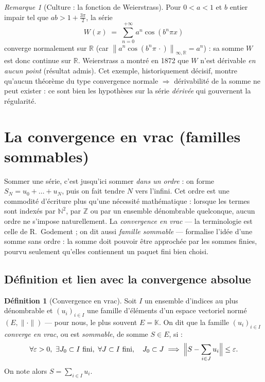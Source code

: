 \documentclass[11pt,a4paper]{article}
\theoremstyle{plain}
\theoremstyle{definition}
\newtheorem{definition}[theoreme]{Définition}
\theoremstyle{remark}
\newtheorem{remarque}[theoreme]{Remarque}
\newcommand{\R}{\mathbb{R}}
\newcommand{\N}{\mathbb{N}}
\newcommand{\K}{\mathbb{K}}
\newcommand{\eps}{\varepsilon}
\newcommand{\Ninf}[2]{\left\lVert #1 \right\rVert_{\infty,#2}}
\numberwithin{equation}{section}
\begin{document}
\begin{remarque}[Culture : la fonction de Weierstrass]
Pour $0<a<1$ et $b$ entier impair tel que $ab>1+\frac{3\pi}{2}$, la série
\[
    W(x) \;=\; \sum_{n=0}^{+\infty} a^n\cos\!\left(b^n\pi x\right)
\]
converge normalement sur $\R$ (car $\Ninf{a^n\cos(b^n\pi\,\cdot)}{\R}
= a^n$) : sa somme $W$ est donc continue sur $\R$. Weierstrass a montré
en 1872 que $W$ n'est dérivable \emph{en aucun point} (résultat admis).
Cet exemple, historiquement décisif, montre qu'aucun théorème du type
\og convergence normale $\Rightarrow$ dérivabilité de la somme \fg{} ne
peut exister : ce sont bien les hypothèses sur la série \emph{dérivée}
qui gouvernent la régularité.
\end{remarque}

\section{La convergence en vrac (familles sommables)}\label{sec:vrac}

Sommer une série, c'est jusqu'ici sommer \emph{dans un ordre} : on forme
$S_N=u_0+\dots+u_N$, puis on fait tendre $N$ vers l'infini. Cet ordre est
une commodité d'écriture plus qu'une nécessité mathématique : lorsque les
termes sont indexés par $\N^2$, par $\mathbb{Z}$ ou par un ensemble
dénombrable quelconque, aucun ordre ne s'impose naturellement. La
\emph{convergence en vrac} --- la terminologie est celle de R.~Godement ;
on dit aussi \emph{famille sommable} --- formalise l'idée d'une somme
\og sans ordre \fg{} : la somme doit pouvoir être approchée par les sommes
finies, pourvu seulement qu'elles contiennent un paquet fini bien choisi.

\subsection{Définition et lien avec la convergence absolue}

\begin{definition}[Convergence en vrac]\label{def:vrac}
Soit $I$ un ensemble d'indices au plus dénombrable et $(u_i)_{i\in I}$ une
famille d'éléments d'un espace vectoriel normé
$(E,\lVert\cdot\rVert)$ --- pour nous, le plus souvent $E=\K$. On dit que
la famille $(u_i)_{i\in I}$ \emph{converge en vrac}, ou est
\emph{sommable}, de somme $S\in E$, si :
\[
\forall \eps>0,\ \exists J_0\subset I \text{ fini},\
\forall J\subset I \text{ fini},\quad
J_0\subset J \;\Longrightarrow\;
\Bigl\lVert S-\sum_{i\in J}u_i\Bigr\rVert\leq\eps .
\]
On note alors $S=\displaystyle\sum_{i\in I}u_i$.
\end{definition}
\end{document}
